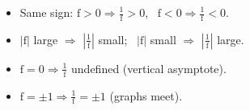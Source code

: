 \documentclass[a4paper,11pt,oneside]{book}
\begin{document}
\begin{info}[title={Note: sketching $y=\frac{1}{\mathrm{f}(x)}$}]
\begin{itemize}\setlength\itemsep{0pt}
\item Same sign: $\mathrm{f}>0\Rightarrow\frac1{\mathrm{f}}>0$, \ $\mathrm{f}<0\Rightarrow\frac1{\mathrm{f}}<0$.
\item $|\mathrm{f}|$ large $\Rightarrow$ $\left|\frac1{\mathrm{f}}\right|$ small; \ $|\mathrm{f}|$ small $\Rightarrow$ $\left|\frac1{\mathrm{f}}\right|$ large.
\item $\mathrm{f}=0\Rightarrow\frac1{\mathrm{f}}$ undefined (vertical asymptote).
\item $\mathrm{f}=\pm1\Rightarrow\frac1{\mathrm{f}}=\pm1$ (graphs meet).
\end{itemize}
\end{info}
\clearpage
\end{document}
